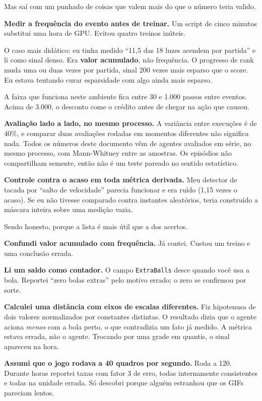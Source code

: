 \documentclass[10pt,a4paper,twoside,twocolumn]{scrartcl}
\let\oldtexttt\texttt
\renewcommand{\texttt}[1]{{\small\oldtexttt{#1}}}
\begin{document}
Mas saí com um punhado de coisas que valem mais do que o número teria
valido.

\textbf{Medir a frequência do evento antes de treinar.} Um script de
cinco minutos substitui uma hora de GPU. Evitou quatro treinos inúteis.

O caso mais didático: eu tinha medido ``11,5 das 18 luzes acendem por
partida'' e li como sinal denso. Era \textbf{valor acumulado}, não
frequência. O progresso de rank muda uma ou duas vezes por partida,
sinal 200 vezes mais esparso que o score. Eu estava tentando curar
esparsidade com algo ainda mais esparso.

A faixa que funciona neste ambiente fica entre 30 e 1.000 passos entre
eventos. Acima de 3.000, o desconto come o crédito antes de chegar na
ação que causou.

\textbf{Avaliação lado a lado, no mesmo processo.} A variância entre
execuções é de 40\%, e comparar duas avaliações rodadas em momentos
diferentes não significa nada. Todos os números deste documento vêm de
agentes avaliados em série, no mesmo processo, com Mann-Whitney entre as
amostras. Os episódios não compartilham semente, então não é um teste
pareado no sentido estatístico.

\textbf{Controle contra o acaso em toda métrica derivada.} Meu detector
de tacada por ``salto de velocidade'' parecia funcionar e era ruído
(1,15 vezes o acaso). Se eu não tivesse comparado contra instantes
aleatórios, teria construído a máscara inteira sobre uma medição vazia.

Sendo honesto, porque a lista é mais útil que a dos acertos.

\textbf{Confundi valor acumulado com frequência.} Já contei. Custou um
treino e uma conclusão errada.

\textbf{Li um saldo como contador.} O campo \texttt{ExtraBalls} desce
quando você usa a bola. Reportei ``zero bolas extras'' pelo motivo
errado; o zero se confirmou por sorte.

\textbf{Calculei uma distância com eixos de escalas diferentes.} Fiz
hipotenusa de dois valores normalizados por constantes distintas. O
resultado dizia que o agente aciona \emph{menos} com a bola perto, o que
contradizia um fato já medido. A métrica estava errada, não o agente.
Trocando por uma grade em quantis, o sinal apareceu na hora.

\textbf{Assumi que o jogo rodava a 40 quadros por segundo.} Roda a 120.
Durante horas reportei taxas com fator 3 de erro, todas internamente
consistentes e todas na unidade errada. Só descobri porque alguém
estranhou que os GIFs pareciam lentos.
\end{document}
